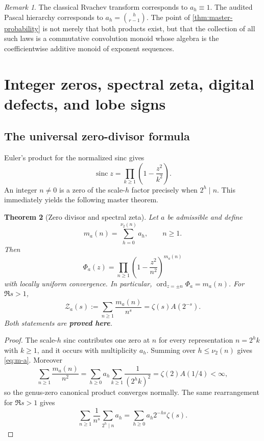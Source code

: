 \documentclass[11pt,oneside]{article}
\numberwithin{equation}{section}
\newtheorem{theorem}{Theorem}[section]
\theoremstyle{definition}
\theoremstyle{remark}
\newtheorem{remark}[theorem]{Remark}
\newcommand{\sinc}{\operatorname{sinc}}
\newcommand{\ord}{\operatorname{ord}}
\newcommand{\vtwo}{\nu_2}
\newcommand{\statusproved}{\textcolor{deepgreen}{\textbf{proved here}}}
\newcommand{\Zspec}{\mathcal Z}
\begin{document}
\begin{remark}
The classical Rvachev transform corresponds to $a_h\equiv1$.  The audited Pascal hierarchy
corresponds to $a_h=\binom h{r-1}$.  The point of \cref{thm:master-probability} is not merely
that both products exist, but that the collection of all such laws is a commutative
convolution monoid whose algebra is the coefficientwise additive monoid of exponent
sequences.
\end{remark}

\section{Integer zeros, spectral zeta, digital defects, and lobe signs}
\label{sec:spectrum}

\subsection{The universal zero-divisor formula}

Euler's product for the normalized sinc gives
\[
 \sinc z=\prod_{k\ge1}\left(1-\frac{z^2}{k^2}\right).
\]
An integer $n\ne0$ is a zero of the scale-$h$ factor precisely when $2^h\mid n$.
This immediately yields the following master theorem.

\begin{theorem}[Zero divisor and spectral zeta]
\label{thm:zero-zeta}
Let $a$ be admissible and define
\begin{equation}
 m_a(n)=\sum_{h=0}^{\vtwo(n)}a_h,
 \qquad n\ge1.
 \label{eq:m-a}
\end{equation}
Then
\begin{equation}
 \boxed{\quad
 \Phi_a(z)=\prod_{n\ge1}\left(1-\frac{z^2}{n^2}\right)^{m_a(n)}
 \quad}
 \label{eq:canonical-a}
\end{equation}
with locally uniform convergence.  In particular,
$\ord_{z=\pm n}\Phi_a=m_a(n)$.  For $\Re s>1$,
\begin{equation}
 \boxed{\quad
 \Zspec_a(s):=\sum_{n\ge1}\frac{m_a(n)}{n^s}
 =\zeta(s)A(2^{-s}).
 \quad}
 \label{eq:zeta-a}
\end{equation}
Both statements are \statusproved.
\end{theorem}

\begin{proof}
The scale-$h$ sinc contributes one zero at $n$ for every representation $n=2^hk$ with
$k\ge1$, and it occurs with multiplicity $a_h$.  Summing over $h\le\vtwo(n)$ gives
\eqref{eq:m-a}.  Moreover
\[
 \sum_{n\ge1}\frac{m_a(n)}{n^2}
 =\sum_{h\ge0}a_h\sum_{k\ge1}\frac1{(2^hk)^2}
 =\zeta(2)A(1/4)<\infty,
\]
so the genus-zero canonical product converges normally.  The same rearrangement for
$\Re s>1$ gives
\[
 \sum_{n\ge1}\frac1{n^s}\sum_{2^h\mid n}a_h
 =\sum_{h\ge0}a_h2^{-hs}\zeta(s).
\]
\end{proof}
\end{document}
